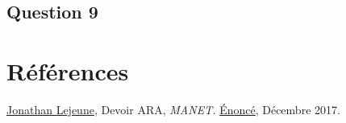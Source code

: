 \documentclass[10pt]{report}
\begin{document}
\subsection{Question 9}
\newpage
\section*{Références}
\href{https://pages.lip6.fr/Jonathan.Lejeune/}{Jonathan Lejeune}, Devoir ARA, \textit{MANET.} \href{https://pages.lip6.fr/Jonathan.Lejeune/documents/enseignements/ARA/sujet\_devoir\_2017\_2018.pdf}{Énoncé}, Décembre 2017.
\newline
\newline
\end{document}

